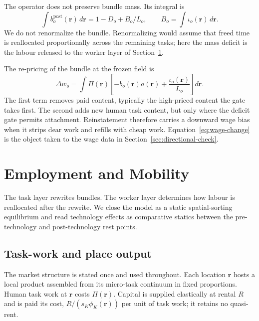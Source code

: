 \documentclass[12pt, a4paper]{article}
\begin{document}
The operator does not preserve bundle mass. Its integral is
\[
  \int b_o^{\text{post}}(\mathbf{r})\,d\mathbf{r}
  =
  1 - D_o + B_o/L_o,
  \qquad
  B_o=\int\iota_o(\mathbf{r})\,d\mathbf{r}.
\]
We do not renormalize the bundle. Renormalizing would assume that freed
time is reallocated proportionally across the remaining tasks; here the
mass deficit is the labour released to the worker layer of
Section~\ref{sec:employment-demand}.

The re-pricing of the bundle at the frozen field is
\begin{equation}
  \Delta w_o
  =
  \int
  \Pi(\mathbf{r})
  \left[
    -b_o(\mathbf{r})a(\mathbf{r})
    +
    \frac{\iota_o(\mathbf{r})}{L_o}
  \right]
  d\mathbf{r}.
  \label{eq:wage-change}
\end{equation}
The first term removes paid content, typically the high-priced content
the gate takes first. The second adds new human task content, but only
where the deficit gate permits attachment. Reinstatement therefore
carries a downward wage bias when it strips dear work and refills with
cheap work. Equation~\eqref{eq:wage-change} is the object taken to the
wage data in Section~\ref{sec:directional-check}.

\section{Employment and Mobility}
\label{sec:employment-demand}

The task layer rewrites bundles. The worker layer determines how labour
is reallocated after the rewrite. We close the model as a static
spatial-sorting equilibrium and read technology effects as comparative
statics between the pre-technology and post-technology rest points.

\subsection{Task-work and place output}
\label{sec:taskwork}

The market structure is stated once and used throughout. Each location
$\mathbf{r}$ hosts a local product assembled from its micro-task
continuum in fixed proportions. Human task work at $\mathbf{r}$ costs
$\Pi(\mathbf{r})$. Capital is supplied elastically at rental $R$ and is
paid its cost, $R/(s_K\phi_K(\mathbf{r}))$ per unit of task work; it
retains no quasi-rent.
\end{document}
